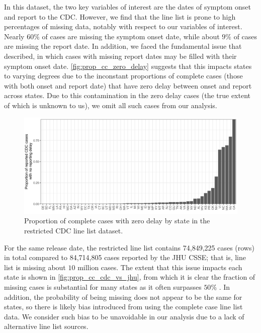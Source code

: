 \documentclass{article}
\begin{document}
In this dataset, the two key variables of interest are the dates of symptom
onset and report to the CDC. However, we find that the line list is prone to
high percentages of missing data, notably with respect to our variables of
interest. Nearly $60\%$ of cases are missing the symptom onset date, while about
$9\%$ of cases are missing the report date. In addition, we faced the
fundamental issue that \citet{jahja2022real} described, in which cases with
missing report dates may be filled with their symptom onset date.
\autoref{fig:prop_cc_zero_delay} suggests that this impacts states
to varying degrees due to the inconstant proportions of complete cases (those with
both onset and report date) that have zero delay between onset and report across
states. Due to this contamination in the zero delay cases (the true extent of
which is unknown to us), we omit all such cases from our analysis.

\begin{figure}[!tb]
\centering
    \includegraphics[width=.99\textwidth]{prop_cc_zero_delay.pdf}
    \caption{Proportion of complete cases with zero delay by state in the 
    restricted CDC line list dataset.}
    \label{fig:prop_cc_zero_delay}
\end{figure}

For the same release date, the restricted line list contains 74,849,225 cases
(rows) in total compared to 84,714,805 cases reported by the JHU CSSE; that is,
line list is missing about $10$ million cases. The
extent that this issue impacts each state is shown in
\autoref{fig:prop_cc_cdc_vs_jhu}, from which it is clear the fraction of missing
cases is substantial for many states as it often surpasses $50\%$
\citep{jahja2022real}. In addition, the probability of being missing does not
appear to be the same for states, so there is likely bias introduced from using
the complete case line list data. We consider such bias to be unavoidable in our
analysis due to a lack of alternative line list sources.
\end{document}
